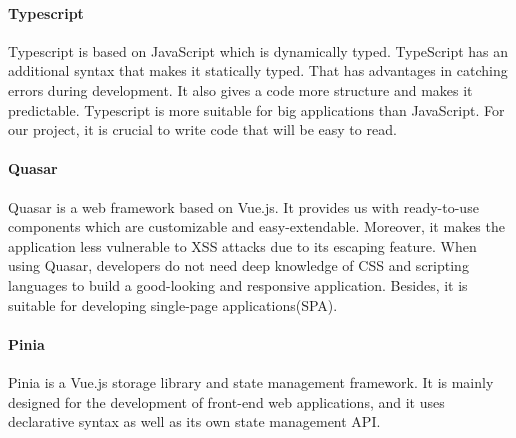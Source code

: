 \paragraph*{Typescript} Typescript is based on JavaScript which is dynamically typed. TypeScript has an additional syntax that makes it statically typed. That has advantages in catching errors during development. It also gives a code more structure and makes it predictable. Typescript is more suitable for big applications than JavaScript. For our project, it is crucial to write code that will be easy to read.\cite{typescript-doc}

\paragraph*{Quasar} Quasar is a web framework based on Vue.js. It provides us with ready-to-use components which are customizable and easy-extendable. Moreover, it makes the application less vulnerable to XSS attacks due to its escaping feature. When using Quasar, developers do not need deep knowledge of CSS and scripting languages to build a good-looking  and responsive application. Besides, it is suitable for developing single-page applications(SPA).\cite{quasar-doc}

\paragraph*{Pinia} Pinia is a Vue.js storage library and state management framework. It is mainly designed for the development of front-end web applications, and it uses declarative syntax as well as its own state management API.\cite{pinia-wiki}

